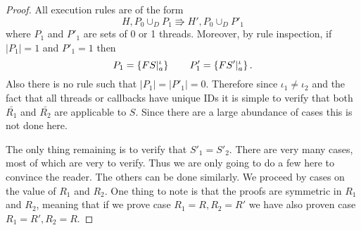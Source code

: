 \begin{proof}
  All execution rules are of the form
  \begin{equation*}
    H, P_0 \cup_D P_1 \Rrightarrow H', P_0 \cup_D P'_1
  \end{equation*}
  where $P_1$ and $P'_1$ are sets of 0 or 1 threads. Moreover, by rule
  inspection, if $|P_1| = 1$ and $P'_1 = 1$ then
  \begin{equation*}
    P_1 =  \left\{ FS|_a^\iota \right\} \quad\quad P'_1 = \left\{ FS'|_a^\iota
    \right\}.
  \end{equation*}
  Also there is no rule such that $|P_1| = |P'_1| = 0$.
  Therefore since $\iota_1 \neq \iota_2$ and the fact that all threads or
  callbacks have unique IDs it is simple to verify that both $\bar{R_1}$ and
  $\bar{R_2}$ are applicable to $S$. Since there are a large abundance of cases
  this is not done here.

  The only thing remaining is to verify that $S'_1 = S'_2$. There are very many
  cases, most of which are very to verify. Thus we are only going to do
  a few here to convince the reader. The others can be done similarly.  We
  proceed by cases on the value of $R_1$ and $R_2$. One thing to note is that
  the proofs are symmetric in $R_1$ and $R_2$, meaning that if we prove case
  $R_1 = R, R_2 = R'$ we have also proven case $R_1 = R', R_2 = R$.


\end{proof}
